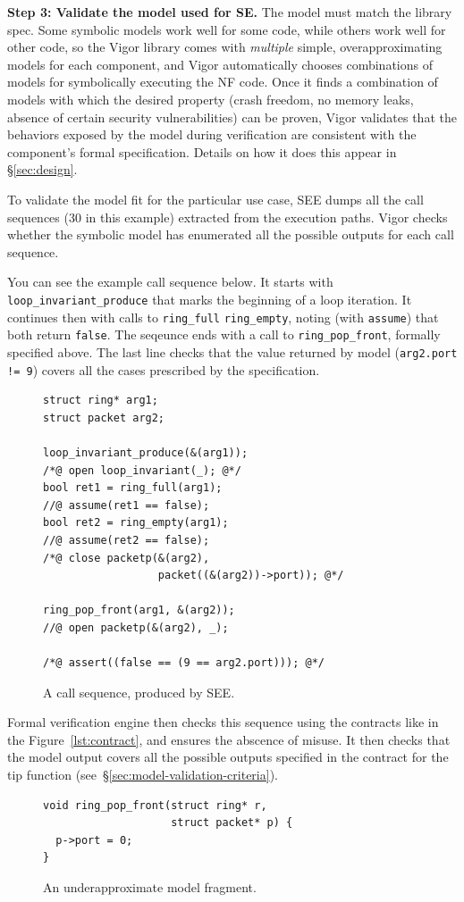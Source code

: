 \documentclass[letterpaper,twocolumn,10pt]{article}
\newcommand{\code}[1]{\lstinline{#1}}
\begin{document}
{\bf Step 3: Validate the model used for SE.} The model must match the library
spec. Some symbolic models work well for some code, while others work well for
other code, so the Vigor library comes with {\em multiple} simple,
overapproximating models for each component, and Vigor automatically chooses
combinations of models for symbolically executing the NF code. Once it finds a
combination of models with which the desired property (crash freedom, no memory
leaks, absence of certain security vulnerabilities) can be proven, Vigor
validates that the behaviors exposed by the model during verification are
consistent with the component's formal specification. Details on how it does
this appear in \S\ref{sec:design}.

To validate the model fit for the particular use case, SEE dumps all the call
sequences (30 in this example) extracted from the execution paths. Vigor
checks whether the symbolic model has enumerated all the possible outputs for
each call sequence.

You can see the example call sequence below. It starts with
\code{loop_invariant_produce} that marks the beginning of a loop iteration. It
continues then with calls to \code{ring_full} \code{ring_empty}, noting (with
\code{assume}) that both return \code{false}. The seqeunce ends with a call to
\code{ring_pop_front}, formally specified above. The last line checks that the
value returned by model (\code{arg2.port != 9}) covers all the cases prescribed
by the specification.
 
\begin{figure}[h!]
\begin{lstlisting}
struct ring* arg1;
struct packet arg2;

loop_invariant_produce(&(arg1));
/*@ open loop_invariant(_); @*/
bool ret1 = ring_full(arg1);
//@ assume(ret1 == false);
bool ret2 = ring_empty(arg1);
//@ assume(ret2 == false);
/*@ close packetp(&(arg2),
                  packet((&(arg2))->port)); @*/

ring_pop_front(arg1, &(arg2));
//@ open packetp(&(arg2), _);

/*@ assert((false == (9 == arg2.port))); @*/
\end{lstlisting}
  \caption{A call sequence, produced by SEE.}
  \label{lst:call-sequence}
\end{figure}

Formal verification engine then checks this sequence using the contracts
like in the Figure~\ref{lst:contract}, and ensures the abscence of misuse. It then checks
that the model output covers all the possible outputs specified in the contract
for the tip function (see~\S\ref{sec:model-validation-criteria}).
\begin{figure}[h!]
\begin{lstlisting}
void ring_pop_front(struct ring* r,
                    struct packet* p) {
  p->port = 0;
}
\end{lstlisting}
  \caption{An underapproximate model fragment.}
  \label{lst:underapproximate}
\end{figure}
\end{document}
